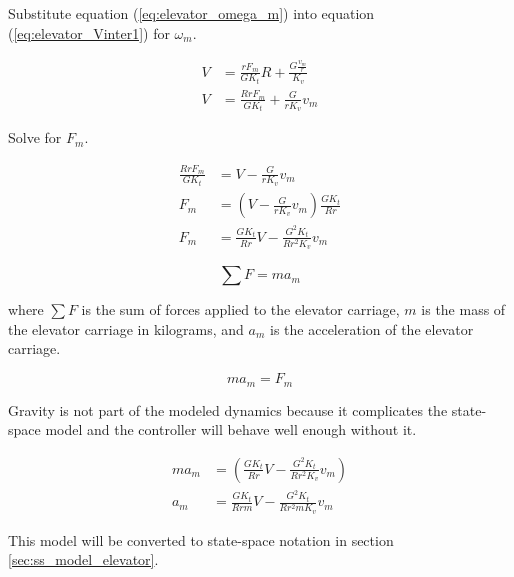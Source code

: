Substitute equation (\ref{eq:elevator_omega_m}) into equation
(\ref{eq:elevator_Vinter1}) for $\omega_m$.

\begin{align*}
  V &= \frac{rF_m}{GK_t} R + \frac{G \frac{v_m}{r}}{K_v} \\
  V &= \frac{RrF_m}{GK_t} + \frac{G}{rK_v} v_m
\end{align*}

Solve for $F_m$.

\begin{align}
  \frac{RrF_m}{GK_t} &= V - \frac{G}{rK_v} v_m \nonumber \\
  F_m &= \left(V - \frac{G}{rK_v} v_m\right) \frac{GK_t}{Rr} \nonumber \\
  F_m &= \frac{GK_t}{Rr} V - \frac{G^2K_t}{Rr^2 K_v} v_m \label{eq:elevator_F_m}
\end{align}

\begin{equation}
  \sum F = ma_m \label{eq:elevator_F_ma}
\end{equation}

where $\sum F$ is the sum of forces applied to the elevator carriage, $m$ is the
mass of the elevator carriage in kilograms, and $a_m$ is the acceleration of the
elevator carriage.

\begin{equation*}
  ma_m = F_m
\end{equation*}

\begin{remark}
  Gravity is not part of the modeled dynamics because it complicates the
  state-space \gls{model} and the controller will behave well enough without it.
\end{remark}

\begin{align}
  ma_m &= \left(\frac{GK_t}{Rr} V - \frac{G^2K_t}{Rr^2 K_v} v_m\right)
    \nonumber \\
  a_m &= \frac{GK_t}{Rrm} V - \frac{G^2K_t}{Rr^2 mK_v} v_m
    \label{eq:elevator_accel}
\end{align}

This model will be converted to state-space notation in section
\ref{sec:ss_model_elevator}.
